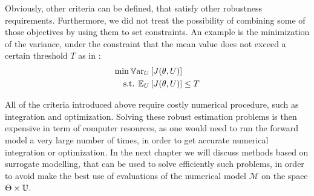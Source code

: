 \documentclass[../../Main_ManuscritThese.tex]{subfiles}
\begin{document}
Obviously, other criteria can be defined, that satisfy other robustness requirements.
Furthermore, we did not treat the possibility of combining some of those objectives by using them to set constraints. An example is the minimization of  the variance, under the constraint that the mean value does not exceed a certain threshold $T$ as in \cite{lehman_designing_2004}:
\begin{align*}
  \min \mathbb{V}\mathrm{ar}_{U}&\left[J(\theta, U)\right]  \\
  \text{s.t. } \mathbb{E}_{U}&\left[J(\theta, U)\right]   \leq T
\end{align*}

All of the criteria introduced above require costly numerical procedure, such as integration and optimization. Solving these robust estimation problems is then expensive in term of computer resources, as one would need to run the forward model a very large number of times, in order to get accurate numerical integration or optimization. In the next chapter we will discuss methods based on surrogate modelling, that can be used to solve efficiently such problems, in order to avoid make the best use of evaluations of the numerical model $\mathcal{M}$ on the space $\Theta \times\mathbb{U}$. 

\subfileLocal{
	\pagestyle{empty}
	
	
      }
\end{document}
